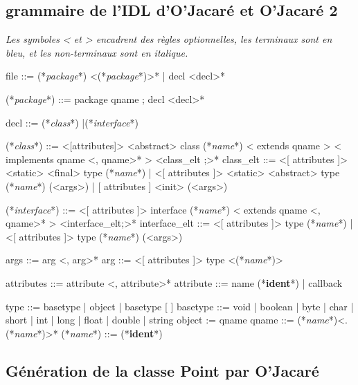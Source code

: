 \documentclass[a4paper, 11pt]{article}
\newcommand{\class}{\ttfamily\textit{class}}
\newcommand{\interface}{\ttfamily\textit{interface}}
\newcommand{\name}{\ttfamily\textit{name}}
\newcommand{\package}{\ttfamily\textit{package}}
\newcommand{\ident}{\footnotesize\textbf{ident}}
\begin{document}
\subsection{grammaire de l'IDL d'O'Jacaré et O'Jacaré 2}\label{5.1}

\emph{Les symboles < et > encadrent des règles optionnelles,
les terminaux sont en bleu, et les non-terminaux sont en italique.}

\begin{idl}
file ::= (*\package*) <(*\package*)>*
  	| decl <decl>*
 
(*\package*) ::= package qname ; decl <decl>*

decl ::= (*\class*)
  	|(*\interface*)
 
(*\class*) ::= <[attributes]> <abstract> class (*\name*)
  	  < extends qname >
  	  < implements qname <, qname>* >
  	  { <class_elt ;>* }
class_elt ::= <[ attributes ]> <static> <final> type (*\name*)
            | <[ attributes ]> <static> <abstract> type (*\name*) (<args>)
            | [ attributes ] <init> (<args>)
 
(*\interface*) ::= <[ attributes ]> interface (*\name*)
  	       < extends qname <, qname>* >
  	      { <interface_elt;>* }
interface_elt ::= 
     <[ attributes ]> type (*\name*)
   | <[ attributes ]> type (*\name*) (<args>)
 
args ::= arg <, arg>*
arg ::= <[ attributes ]> type <(*\name*)>
 
attributes ::= 	attribute <, attribute>*
attribute ::= name (*\ident*)
  	    | callback
 
type ::= basetype
       | object
       | basetype [ ]
basetype ::= void
           | boolean
           | byte
           | char
           | short
           | int
           | long
           | float
           | double
           | string
object := qname
qname ::= (*\name*)<.(*\name*)>*
(*\name*) ::= (*\ident*)
\end{idl}

\newpage
\subsection{Génération de la classe Point par O'Jacaré}
\end{document}
